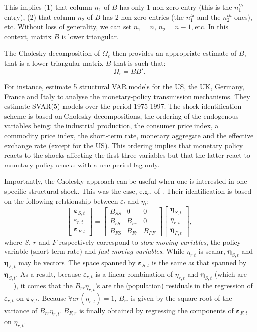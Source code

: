 \documentclass[
  12pt,
]{book}
\theoremstyle{definition}
\theoremstyle{definition}
\theoremstyle{definition}
\theoremstyle{definition}
\theoremstyle{remark}
\begin{document}
This implies (1) that column \(n_1\) of \(B\) has only 1 non-zero entry (this is the \(n_1^{th}\) entry), (2) that column \(n_2\) of \(B\) has 2 non-zero entries (the \(n_1^{th}\) and the \(n_2^{th}\) ones), etc. Without loss of generality, we can set \(n_1=n\), \(n_2=n-1\), etc. In this context, matrix \(B\) is lower triangular.

The Cholesky decomposition of \(\Omega_{\varepsilon}\) then provides an appropriate estimate of \(B\), that is a lower triangular matrix \(B\) that is such that:
\[
\Omega_\varepsilon = BB'.
\]

For instance, \citet{DEDOLA20051543} estimate 5 structural VAR models for the US, the UK, Germany, France and Italy to analyse the monetary-policy transmission mechanisms. They estimate SVAR(5) models over the period 1975-1997. The shock-identification scheme is based on Cholesky decompositions, the ordering of the endogenous variables being: the industrial production, the consumer price index, a commodity price index, the short-term rate, monetary aggregate and the effective exchange rate (except for the US). This ordering implies that monetary policy reacts to the shocks affecting the first three variables but that the latter react to monetary policy shocks with a one-period lag only.

Importantly, the Cholesky approach can be useful when one is interested in one specific structural shock. This was the case, e.g., of \citet{Christiano_Eichenbaum_Evans_1996}. Their identification is based on the following relationship between \(\varepsilon_t\) and \(\eta_t\):
\[
\left[\begin{array}{c}
\boldsymbol\varepsilon_{S,t}\\
\varepsilon_{r,t}\\
\boldsymbol\varepsilon_{F,t}
\end{array}\right] =
\left[\begin{array}{ccc}
B_{SS} & 0 & 0 \\
B_{rS} & B_{rr} & 0 \\
B_{FS} & B_{Fr} & B_{FF}
\end{array}\right]
\left[\begin{array}{c}
\boldsymbol\eta_{S,t}\\
\eta_{r,t}\\
\boldsymbol\eta_{F,t}
\end{array}\right],
\]
where \(S\), \(r\) and \(F\) respectively correspond to \emph{slow-moving variables}, the policy variable (short-term rate) and \emph{fast-moving variables}. While \(\eta_{r,t}\) is scalar, \(\boldsymbol\eta_{S,t}\) and \(\boldsymbol\eta_{F,t}\) may be vectors. The space spanned by \(\boldsymbol\varepsilon_{S,t}\) is the same as that spanned by \(\boldsymbol\eta_{S,t}\). As a result, because \(\varepsilon_{r,t}\) is a linear combination of \(\eta_{r,t}\) and \(\boldsymbol\eta_{S,t}\) (which are \(\perp\)), it comes that the \(B_{rr}\eta_{r,t}\)'s are the (population) residuals in the regression of \(\varepsilon_{r,t}\) on \(\boldsymbol\varepsilon_{S,t}\). Because \(\mathbb{V}ar(\eta_{r,t})=1\), \(B_{rr}\) is given by the square root of the variance of \(B_{rr}\eta_{r,t}\). \(B_{F,r}\) is finally obtained by regressing the components of \(\boldsymbol\varepsilon_{F,t}\) on \(\eta_{r,t}\).
\end{document}

